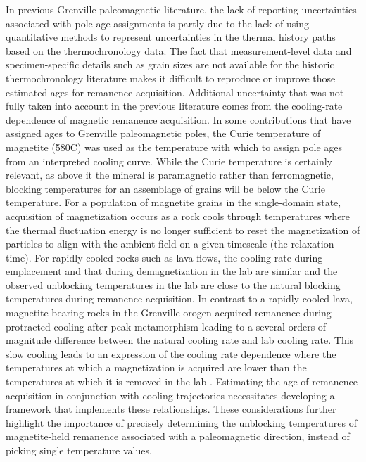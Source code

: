 In previous Grenville paleomagnetic literature, the lack of reporting uncertainties associated with pole age assignments is partly due to the lack of using quantitative methods to represent uncertainties in the thermal history paths based on the thermochronology data. The fact that measurement-level data and specimen-specific details such as grain sizes are not available for the historic thermochronology literature makes it difficult to reproduce or improve those estimated ages for remanence acquisition. Additional uncertainty that was not fully taken into account in the previous literature comes from the cooling-rate dependence of magnetic remanence acquisition. In some contributions that have assigned ages to Grenville paleomagnetic poles, the Curie temperature of magnetite (580\textdegree C) was used as the temperature with which to assign pole ages from an interpreted cooling curve. While the Curie temperature is certainly relevant, as above it the mineral is paramagnetic rather than ferromagnetic, blocking temperatures for an assemblage of grains will be below the Curie temperature. For a population of magnetite grains in the single-domain state, acquisition of magnetization occurs as a rock cools through temperatures where the thermal fluctuation energy is no longer sufficient to reset the magnetization of particles to align with the ambient field on a given timescale (the relaxation time). For rapidly cooled rocks such as lava flows, the cooling rate during emplacement and that during demagnetization in the lab are similar and the observed unblocking temperatures in the lab are close to the natural blocking temperatures during remanence acquisition. In contrast to a rapidly cooled lava, magnetite-bearing rocks in the Grenville orogen acquired remanence during protracted cooling after peak metamorphism leading to a several orders of magnitude difference between the natural cooling rate and lab cooling rate. This slow cooling leads to an expression of the cooling rate dependence where the temperatures at which a magnetization is acquired are lower than the temperatures at which it is removed in the lab \citep{Pullaiah1975b, Halgedahl1980a, Dodson1980a}. Estimating the age of remanence acquisition in conjunction with cooling trajectories necessitates developing a framework that implements these relationships. These considerations further highlight the importance of precisely determining the unblocking temperatures of magnetite-held remanence associated with a paleomagnetic direction, instead of picking single temperature values. 

